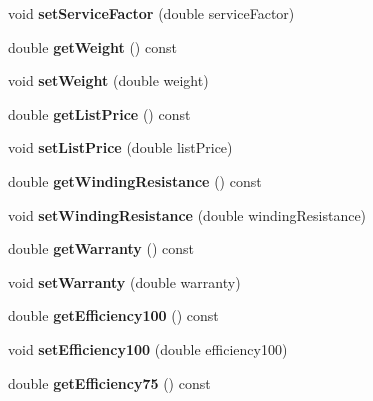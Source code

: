 \begin{DoxyCompactItemize}
void {\bfseries set\+Service\+Factor} (double service\+Factor)
\item 
\mbox{\label{class_motor_data_a12903f6e79416bffa80b217dee6cbc8c}} 
double {\bfseries get\+Weight} () const
\item 
\mbox{\label{class_motor_data_aadf0258ade287078a57493644b90c12a}} 
void {\bfseries set\+Weight} (double weight)
\item 
\mbox{\label{class_motor_data_a73b5f609b313e1b071da76f0c2430649}} 
double {\bfseries get\+List\+Price} () const
\item 
\mbox{\label{class_motor_data_addbfade0ae45f1b49554a923c819debb}} 
void {\bfseries set\+List\+Price} (double list\+Price)
\item 
\mbox{\label{class_motor_data_a4ce68beb85d4b904e173c2570c04846b}} 
double {\bfseries get\+Winding\+Resistance} () const
\item 
\mbox{\label{class_motor_data_a4dd9a4f231dc0fce6ba8a780bf5d7796}} 
void {\bfseries set\+Winding\+Resistance} (double winding\+Resistance)
\item 
\mbox{\label{class_motor_data_a3d0da64855a76a96e17bedb9b94aa5a7}} 
double {\bfseries get\+Warranty} () const
\item 
\mbox{\label{class_motor_data_affd407ad3b6e18b3c611b5c82a986737}} 
void {\bfseries set\+Warranty} (double warranty)
\item 
\mbox{\label{class_motor_data_af71f431074380c5251522ea0a30dd450}} 
double {\bfseries get\+Efficiency100} () const
\item 
\mbox{\label{class_motor_data_a61ba89edc6ec243f8012a11aaed5eaa9}} 
void {\bfseries set\+Efficiency100} (double efficiency100)
\item 
\mbox{\label{class_motor_data_a953c733a4409ff686329e2bb89c1af8a}} 
double {\bfseries get\+Efficiency75} () const
\item 

\end{DoxyCompactItemize}
